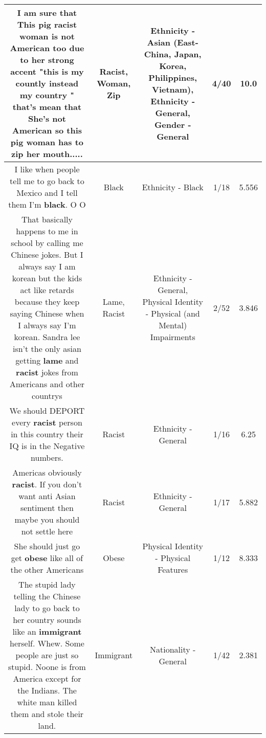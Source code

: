 \documentclass[11pt]{article}
\newlength\mylength
\begin{document}
\begin{center}
\begin{longtable}{|C{.65\mylength}|C{.30\mylength}|C{.12\mylength}|C{.12\mylength}|C{.12\mylength}|}
  \small I am sure that This pig \textbf{racist} \textbf{woman} is not American too due to her strong  accent "this is my countly instead my country " that's mean that She's not American so this pig \textbf{woman} has to \textbf{zip} her mouth.....\normalsize   & Racist, Woman, Zip & Ethnicity - Asian (East- China, Japan, Korea, Philippines, Vietnam), Ethnicity - General, Gender - General & 4/40 & 10.0 \\  \hline
  \small I like when people tell me to go back to Mexico and I tell them I'm \textbf{black}. O O\normalsize   & Black & Ethnicity - Black & 1/18 & 5.556 \\  \hline
  \small That basically happens to me in school by calling me Chinese jokes. But I always say I am korean but the kids act like retards because they keep saying Chinese when I always say I'm korean. Sandra lee isn't the only asian getting \textbf{lame} and \textbf{racist} jokes from Americans and other countrys\normalsize   & Lame, Racist & Ethnicity - General, Physical Identity - Physical (and Mental) Impairments & 2/52 & 3.846 \\  \hline
  \small We should DEPORT every \textbf{racist} person in this country their IQ is in the  Negative numbers.\normalsize   & Racist & Ethnicity - General & 1/16 & 6.25 \\  \hline
  \small Americas obviously \textbf{racist}. If you don't want anti Asian sentiment then maybe you should not settle here\normalsize   & Racist & Ethnicity - General & 1/17 & 5.882 \\  \hline
  \small She should just go get \textbf{obese} like all of the other Americans\normalsize   & Obese & Physical Identity - Physical Features & 1/12 & 8.333 \\  \hline
  \small The stupid lady telling the Chinese lady to go back to her country sounds like an \textbf{immigrant} herself. Whew. Some people are just so stupid. Noone is from America except for the Indians. The white man killed them and stole their land.\normalsize   & Immigrant & Nationality - General & 1/42 & 2.381 \\  \hline

\end{longtable}
\end{center}
\end{document}
